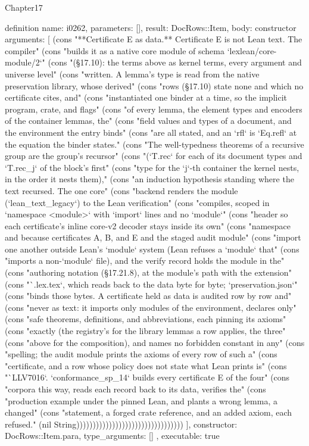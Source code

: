 \begin{lexlean}{Chapter17}
\begin{semanticmodule}
definition{
  name: i0262,
  parameters: [],
  result: DocRows::Item,
  body: constructor{
    arguments: [
      (cons "**Certificate E as data.** Certificate E is not Lean text. The compiler" (cons "builds it as a native core module of schema `lexlean/core-module/2`" (cons "(§17.10): the terms above as kernel terms, every argument and universe level" (cons "written. A lemma's type is read from the native preservation library, whose derived" (cons "rows (§17.10) state none and which no certificate cites, and" (cons "instantiated one binder at a time, so the implicit program, crate, and flags" (cons "of every lemma, the element types and encoders of the container lemmas, the" (cons "field values and types of a document, and the environment the entry binds" (cons "are all stated, and an `rfl` is `Eq.refl` at the equation the binder states." (cons "The well-typedness theorems of a recursive group are the group's recursor" (cons "(`T.rec` for each of its document types and `T.rec_j` of the block's first" (cons "type for the `j`-th container the kernel nests, in the order it nests them)," (cons "an induction hypothesis standing where the text recursed. The one core" (cons "backend renders the module (`lean_text_legacy`) to the Lean verification" (cons "compiles, scoped in `namespace <module>` with `import` lines and no `module`" (cons "header so each certificate's inline core-v2 decoder stays inside its own" (cons "namespace and because certificates A, B, and E and the staged audit module" (cons "import one another outside Lean's `module` system (Lean refuses a `module` that" (cons "imports a non-`module` file), and the verify record holds the module in the" (cons "authoring notation (§17.21.8), at the module's path with the extension" (cons "`.lex.tex`, which reads back to the data byte for byte; `preservation.json`" (cons "binds those bytes. A certificate held as data is audited row by row and" (cons "never as text: it imports only modules of the environment, declares only" (cons "safe theorems, definitions, and abbreviations, each pinning its axioms" (cons "exactly (the registry's for the library lemmas a row applies, the three" (cons "above for the composition), and names no forbidden constant in any" (cons "spelling; the audit module prints the axioms of every row of such a" (cons "certificate, and a row whose policy does not state what Lean prints is" (cons "`LLV7016`. `conformance_sp_14` builds every certificate E of the four" (cons "corpora this way, reads each record back to its data, verifies the" (cons "production example under the pinned Lean, and plants a wrong lemma, a changed" (cons "statement, a forged crate reference, and an added axiom, each refused." (nil String)))))))))))))))))))))))))))))))))
    ],
    constructor: DocRows::Item.para,
    type_arguments: []
  },
  executable: true
}


\end{semanticmodule}
\end{lexlean}
